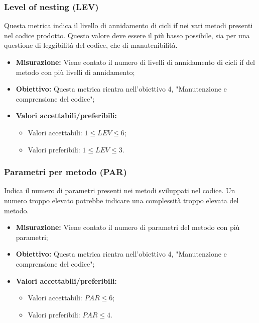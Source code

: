 \subsubsection{Level of nesting (LEV)}
Questa metrica indica il livello di annidamento di cicli if nei vari metodi presenti nel codice prodotto. Questo valore deve essere il più basso possibile, sia per una questione di leggibilità del codice, che di manutenibilità.
\begin{itemize}
	\item \textbf{Misurazione:} Viene contato il numero di livelli di annidamento di cicli if del metodo con più livelli di annidamento;
	\item \textbf{Obiettivo:} Questa metrica rientra nell'obiettivo 4, "Manutenzione e comprensione del codice";
	\item \textbf{Valori accettabili/preferibili: }
	\begin{itemize}
		\item Valori accettabili: $1\leq LEV \leq 6$;
		\item Valori preferibili: $1\leq LEV \leq 3$.
	\end{itemize}
\end{itemize}


\subsubsection{Parametri per metodo (PAR)}
Indica il numero di parametri presenti nei metodi sviluppati nel codice. Un numero troppo elevato potrebbe indicare una complessità troppo elevata del metodo.
\begin{itemize}
	\item \textbf{Misurazione:} Viene contato il numero di parametri del metodo con più parametri;
	\item \textbf{Obiettivo:} Questa metrica rientra nell'obiettivo 4, "Manutenzione e comprensione del codice";
	\item \textbf{Valori accettabili/preferibili: }
	\begin{itemize}
		\item Valori accettabili: $PAR \leq 6$;
		\item Valori preferibili: $PAR \leq 4$.
	\end{itemize}
\end{itemize}



